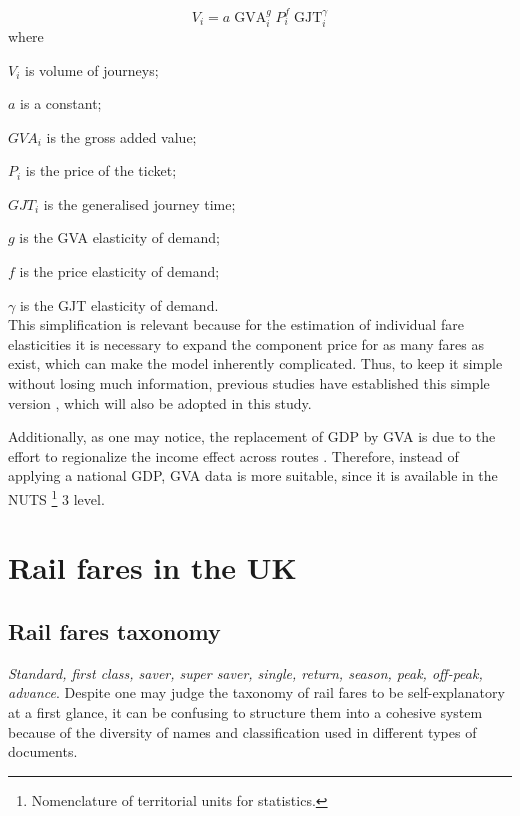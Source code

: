 \begin{equation}
\label{eq:demand_pdfh}
V_{i} = a \; \text{GVA}^g_i \; P^f_i \; \text{GJT}^\gamma_i
\end{equation}
where

$V_i$ is volume of journeys;

$a$ is a constant;

$GVA_i$ is the gross added value;

$P_i$ is the price of the ticket;

$GJT_i$ is the generalised journey time;

$g$ is the GVA elasticity of demand;

$f$ is the price elasticity of demand;

$\gamma$ is the GJT elasticity of demand.
\\[3pt]

This simplification is relevant because for the estimation of individual fare elasticities it is necessary to expand the component price for as many fares as exist, which can make the model inherently complicated. Thus, to keep it simple without losing much information, previous studies have established this simple version \citep{its-systra-report}, which will also be adopted in this study. 

Additionally, as one may notice, the replacement of GDP by GVA is due to the effort to regionalize the income effect across routes \citep{pdfhv5}. Therefore, instead of applying a national GDP, GVA  data is more suitable, since it is available in the NUTS \footnote{Nomenclature of territorial units for statistics.} 3 level.

\section{Rail fares in the UK}

\subsection{Rail fares taxonomy}

\textit{Standard, first class, saver, super saver, single, return, season, peak, off-peak, advance}. Despite one may judge the taxonomy of rail fares to be self-explanatory at a first glance, it can be confusing to structure them into a cohesive system because of the diversity of names and classification used in different types of documents. 


